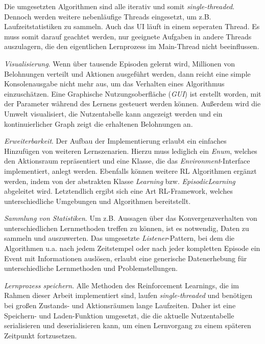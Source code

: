 Die umgesetzten Algorithmen sind alle iterativ und somit \textit{single-threaded}. Dennoch werden weitere nebenläufige Threads eingesetzt, um z.B. Laufzeitstatistiken zu sammeln. Auch das UI läuft in einem seperaten Thread. Es muss somit darauf geachtet werden, nur geeignete Aufgaben in andere Threads auszulagern, die den eigentlichen Lernprozess im Main-Thread nicht beeinflussen.
\par 
\textit{Visualisierung}. Wenn über tausende Episoden gelernt wird, Millionen von Belohnungen verteilt und Aktionen ausgeführt werden, dann reicht eine simple Konsolenausgabe nicht mehr aus, um das Verhalten eines Algorithmus einzuschätzen. Eine Graphische Nutzungsoberfläche (\textit{GUI}) ist erstellt worden, mit der Parameter während des Lernens gesteuert werden können. Außerdem wird die Umwelt visualisiert, die Nutzentabelle kann angezeigt werden und ein kontinuierlicher Graph zeigt die erhaltenen Belohnungen an.

\textit{Erweiterbarkeit}. Der Aufbau der Implementierung erlaubt ein einfaches Hinzufügen von weiteren Lernszenarien. Hierzu muss lediglich ein \textit{Enum}, welches den Aktionsraum repräsentiert und eine Klasse, die das \textit{Environment}-Interface implementiert, anlegt werden. Ebenfalls können weitere RL Algorithmen ergänzt werden, indem von der abstrakten Klasse \textit{Learning} bzw. \textit{EpisodicLearning} abgeleitet wird. Letztendlich ergibt sich eine Art RL-Framework, welches unterschiedliche Umgebungen und Algorithmen bereitstellt.

\textit{Sammlung von Statistiken}. Um z.B. Aussagen über das Konvergenzverhalten von unterschiedlichen Lernmethoden treffen zu können, ist es notwendig, Daten zu sammeln und auszuwerten. Das umgesetzte \textit{Listener}-Pattern, bei dem die Algorithmen u.a. nach jedem Zeitstempel oder nach jeder kompletten Episode ein Event mit Informationen auslösen, erlaubt eine generische Datenerhebung für unterschiedliche Lernmethoden und Problemstellungen.

\textit{Lernprozess speichern}. Alle Methoden des Reinforcement Learnings, die im Rahmen dieser Arbeit implementiert sind, laufen \textit{single-threaded} und benötigen bei großen Zustands- und Aktionsräumen lange Laufzeiten. Daher ist eine Speichern- und Laden-Funktion umgesetzt, die die aktuelle Nutzentabelle serialisieren und deserialisieren kann, um einen Lernvorgang zu einem späteren Zeitpunkt fortzusetzen.

